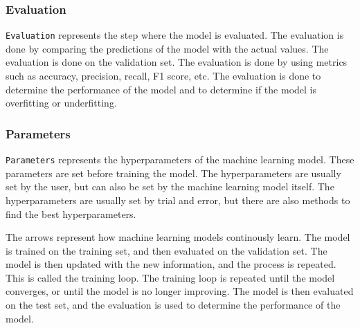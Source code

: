 \subsubsection{Evaluation}\label{subsubsec:machine-learning-pipeline-evaluation}
\texttt{Evaluation} represents the step where the model is evaluated. The evaluation is done by comparing the predictions of the model with the actual values. The evaluation is done on the validation set. The evaluation is done by using metrics such as accuracy, precision, recall, F1 score, etc. The evaluation is done to determine the performance of the model and to determine if the model is overfitting or underfitting.

\subsubsection{Parameters}\label{subsubsec:machine-learning-pipeline-parameters}
\texttt{Parameters} represents the hyperparameters of the machine learning model. These parameters are set before training the model. The hyperparameters are usually set by the user, but can also be set by the machine learning model itself. The hyperparameters are usually set by trial and error, but there are also methods to find the best hyperparameters.

The arrows represent how machine learning models continously learn. The model is trained on the training set, and then evaluated on the validation set. The model is then updated with the new information, and the process is repeated. This is called the training loop. The training loop is repeated until the model converges, or until the model is no longer improving. The model is then evaluated on the test set, and the evaluation is used to determine the performance of the model.




